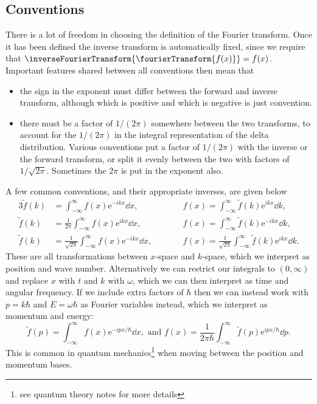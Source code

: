 \documentclass[fleqn]{NotesClass}
\newcommand*{\e}{\mathrm{e}}
\begin{document}
    \subsection{Conventions}
    There is a lot of freedom in choosing the definition of the Fourier transform.
    Once it has been defined the inverse transform is automatically fixed, since we require that \(\inverseFourierTransform\{\fourierTransform\{f(x)\}\} = f(x)\).
    Important features shared between all conventions then mean that
    \begin{itemize}
        \item the sign in the exponent must differ between the forward and inverse transform, although which is positive and which is negative is just convention.
        \item there must be a factor of \(1/(2\pi)\) somewhere between the two transforms, to account for the \(1/(2\pi)\) in the integral representation of the delta distribution.
        Various conventions put a factor of \(1/(2\pi)\) with the inverse or the forward transform, or split it evenly between the two with factors of \(1/\sqrt{2\pi}\).
        Sometimes the \(2\pi\) is put in the exponent also.
    \end{itemize}
    
    A few common conventions, and their appropriate inverses, are given below
    \begin{alignat*}{3}
        \tilde{f}(k) &= \int_{-\infty}^{\infty} f(x)\e^{-ikx} \dd{x}, \qquad && f(x) = \int_{-\infty}^{\infty} \tilde{f}(k)\e^{ikx} \dd{k},\\
        \tilde{f}(k) &= \frac{1}{2\pi}\int_{-\infty}^{\infty} f(x)\e^{ikx} \dd{x}, \qquad && f(x) = \int_{-\infty}^{\infty} \tilde{f}(k)\e^{-ikx} \dd{k},\\
        \tilde{f}(k) &= \frac{1}{\sqrt{2\pi}} \int_{-\infty}^{\infty} f(x)\e^{-ikx} \dd{x}, \qquad && f(x) = \frac{1}{\sqrt{2\pi}} \int_{-\infty}^{\infty} \tilde{f}(k) \e^{ikx} \dd{k}.
    \end{alignat*}
    These are all transformations between \(x\)-space and \(k\)-space, which we interpret as position and wave number.
    Alternatively we can restrict our integrals to \((0, \infty)\) and replace \(x\) with \(t\) and \(k\) with \(\omega\), which we can then interpret as time and angular frequency.
    If we include extra factors of \(\hbar\) then we can instead work with \(p = k\hbar\) and \(E = \omega\hbar\) as Fourier variables instead, which we interpret as momentum and energy:
    \begin{equation}
        \tilde{f}(p) = \int_{-\infty}^{\infty} f(x)\e^{-ipx/\hbar} \dd{x}, \text{ and } f(x) = \frac{1}{2\pi\hbar} \int_{-\infty}^{\infty} \tilde{f}(p)\e^{ipx/\hbar} \dd{p}.
    \end{equation}
    This is common in quantum mechanics\footnote{see quantum theory notes for more details} when moving between the position and momentum bases.
    
\end{document}
